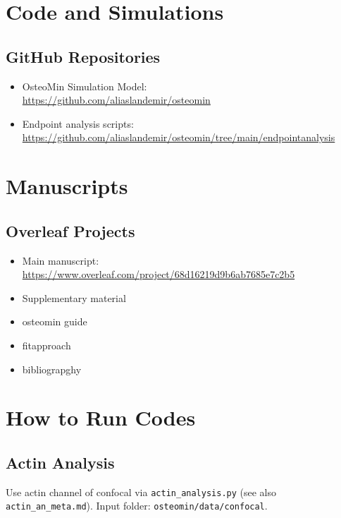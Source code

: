 \documentclass[11pt,a4paper]{article}
\newcommand{\gitmain}{https://github.com/aliaslandemir/osteomin}
\newcommand{\gitanalysis}{https://github.com/aliaslandemir/osteomin/tree/main/endpointanalysis}
\newcommand{\ovlmain}{https://www.overleaf.com/project/68d16219d9b6ab7685e7c2b5}
\begin{document}
\section{Code and Simulations}

\subsection{GitHub Repositories}
\begin{itemize}
  \item OsteoMin Simulation Model: \\[2pt]\url{\gitmain}
  \item Endpoint analysis scripts: \\[2pt]\url{\gitanalysis}
\end{itemize}


\section{Manuscripts}

\subsection{Overleaf Projects}
\begin{itemize}
  \item Main manuscript: \\[2pt]\url{\ovlmain}
  \item Supplementary material
  \item osteomin guide
  \item fitapproach
  \item bibliograpghy
\end{itemize}





\newpage

\section{How to Run Codes}


\subsection{Actin Analysis}

Use actin channel of confocal via \texttt{actin\_analysis.py}  
(see also \texttt{actin\_an\_meta.md}).  
Input folder: \texttt{osteomin/data/confocal}.
\end{document}
